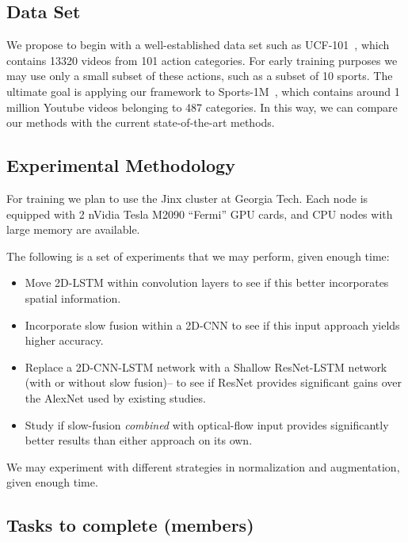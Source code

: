\subsection*{Data Set}
We propose to begin with a well-established data set such as UCF-101~\cite{ucf101}, which contains 13320 videos from 101 action categories. For early training purposes we may use only a small subset of these actions, such as a subset of 10 sports. The ultimate goal is applying our framework to Sports-1M~\cite{cnnvid}, which contains around 1 million Youtube videos belonging to 487 categories. In this way, we can compare our methods with the current state-of-the-art methods.

\subsection*{Experimental Methodology}
For training we plan to use the Jinx cluster at Georgia Tech. Each node is equipped with 2 nVidia Tesla M2090 ``Fermi'' GPU cards, and CPU nodes with large memory are available.

The following is a set of experiments that we may perform, given enough time:
\begin{itemize}
\item Move 2D-LSTM within convolution layers to see if this better incorporates spatial information.
\item Incorporate slow fusion within a 2D-CNN to see if this input approach yields higher accuracy.
\item Replace a 2D-CNN-LSTM network with a Shallow ResNet-LSTM network (with or without slow fusion)-- to see if ResNet provides significant gains over the AlexNet used by existing studies.
\item Study if slow-fusion \emph{combined} with optical-flow input provides significantly better results than either approach on its own.
\end{itemize}
We may experiment with different strategies in normalization and augmentation, given enough time.

\subsection*{Tasks to complete (members)}

